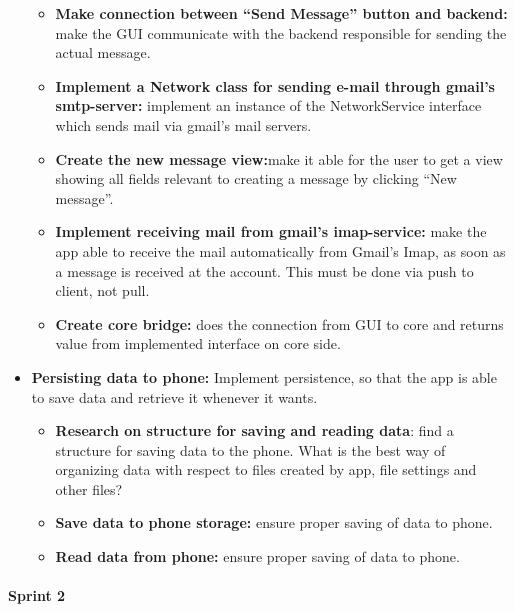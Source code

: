 \begin{itemize}
\begin{itemize}
\item{}\textbf{Make connection between “Send Message” button and backend:} make the GUI communicate with the backend responsible for sending the actual message.
\item{}\textbf{Implement a Network class for sending e-mail through gmail’s smtp-server:} implement an instance of the NetworkService interface which sends mail via gmail’s mail servers.
\item{}\textbf{Create the new message view:}make it able for the user to get a view showing all fields relevant to creating a message by clicking “New message”.
\item{}\textbf{Implement receiving mail from gmail’s imap-service:} make the app able to receive the mail automatically from Gmail’s Imap, as soon as a message is received at the account. This must be done via push to client, not pull.
\item{}\textbf{Create core bridge:} does the connection from GUI to core and returns value from implemented interface on core side.
\end{itemize}
\item{}\textbf{Persisting data to phone:} Implement persistence, so that the app is able to save data and retrieve it whenever it wants.
\begin{itemize}
\item{}\textbf{Research on structure for saving and reading data}: find a structure for saving data to the phone. What is the best way of organizing data with respect to files created by app, file settings and other files?
\item{}\textbf{Save data to phone storage:} ensure proper saving of data to phone.
\item{}\textbf{Read data from phone:} ensure proper saving of data to phone.
\end{itemize}
\end{itemize}

\paragraph{Sprint 2}

